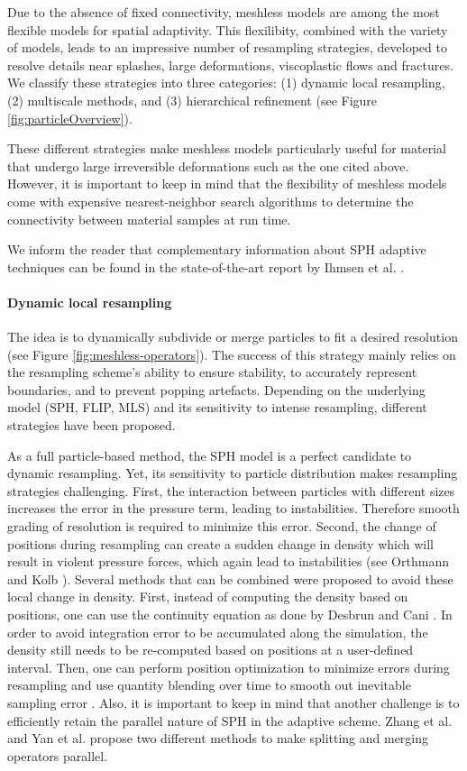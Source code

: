 Due to the absence of fixed connectivity, meshless models are among the most flexible models for spatial adaptivity. This flexilibity, combined with the variety of models, leads to an impressive number of resampling strategies, developed to resolve details near splashes, large deformations, viscoplastic flows and fractures. We classify these strategies into three categories: (1) dynamic local resampling, (2) multiscale methods, and (3) hierarchical refinement (see Figure \ref{fig:particleOverview}).

These different strategies make meshless models particularly useful for material that undergo large irreversible deformations such as the one cited above. However, it is important to keep in mind that the flexibility of meshless models come with expensive nearest-neighbor search algorithms to determine the connectivity between material samples at run time.

We inform the reader that complementary information about SPH adaptive techniques can be found in the state-of-the-art report by Ihmsen et al. \cite{Ihmsen2014}.

\paragraph*{Dynamic local resampling} The idea is to dynamically subdivide or merge particles to fit a desired resolution (see Figure \ref{fig:meshless-operators}). The success of this strategy mainly relies on the resampling scheme's ability to ensure stability, to accurately represent boundaries, and to prevent popping artefacts. Depending on the underlying model (SPH, FLIP, MLS) and its sensitivity to intense resampling, different strategies have been proposed.

As a full particle-based method, the SPH model is a perfect candidate to dynamic resampling. Yet, its sensitivity to particle distribution makes resampling strategies challenging. First, the interaction between particles with different sizes increases the error in the pressure term, leading to instabilities. Therefore smooth grading of resolution is required to minimize this error. Second, the change of positions during resampling can create a sudden change in density which will result in violent pressure forces, which again lead to instabilities (see Orthmann and Kolb \cite{Orthmann2012}).
Several methods that can be combined were proposed to avoid these local change in density. First, instead of computing the density based on positions, one can use the continuity equation as done by Desbrun and Cani \cite{Desbrun1999}. In order to avoid integration error to be accumulated along the simulation, the density still needs to be re-computed based on positions at a user-defined interval. Then, one can perform position optimization to minimize errors during resampling \cite{Adams2007} and use quantity blending over time to smooth out inevitable sampling error \cite{Orthmann2012}.
Also, it is important to keep in mind that another challenge is to efficiently retain the parallel nature of SPH in the adaptive scheme. Zhang et al. \cite{Zhang2008} and Yan et al. \cite{Yan2009} propose two different methods to make splitting and merging operators parallel.

